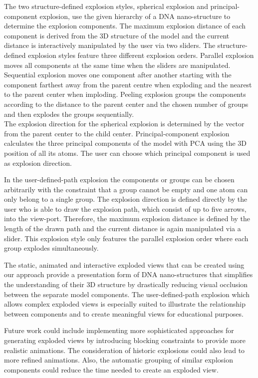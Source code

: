 \documentclass[draft,final]{vutinfth} %
\begin{document}
\par The two structure-defined explosion styles, spherical explosion and principal-component explosion, use the given hierarchy of a DNA nano-structure to determine the explosion components. The maximum explosion distance of each component is derived from the 3D structure of the model and the current distance is interactively manipulated by the user via two sliders. The structure-defined explosion styles feature three different explosion orders. Parallel explosion moves all components at the same time when the sliders are manipulated. Sequential explosion moves one component after another starting with the component farthest away from the parent centre when exploding and the nearest to the parent center when imploding. Peeling explosion groups the components according to the distance to the parent center and the chosen number of groups and then explodes the groups sequentially.
\\The explosion direction for the spherical explosion is determined by the vector from the parent center to the child center. Principal-component explosion calculates the three principal components of the model with PCA \cite{jolliffe2011principal} using the 3D position of all its atoms. The user can choose which principal component is used as explosion direction.

\par In the user-defined-path explosion the components or groups can be chosen arbitrarily with the constraint that a group cannot be empty and one atom can only belong to a single group. The explosion direction is defined directly by the user who is able to draw the explosion path, which consist of up to five arrows, into the view-port. Therefore, the maximum explosion distance is defined by the length of the drawn path and the current distance is again manipulated via a slider. This explosion style only features the parallel explosion order where each group explodes simultaneously.

\par The static, animated and interactive exploded views that can be created using our approach provide a presentation form of DNA nano-structures that simplifies the understanding of their 3D structure by drastically reducing visual occlusion between the separate model components. The user-defined-path explosion which allows complex exploded views is especially suited to illustrate the relationship between components and to create meaningful views for educational purposes.

\par Future work could include implementing more sophisticated approaches for generating exploded views by introducing blocking constraints to provide more realistic animations. The consideration of historic explosions could also lead to more refined animations. Also, the automatic grouping of similar explosion components could reduce the time needed to create an exploded view. 

\backmatter

\printindex

\printglossaries



\end{document}

